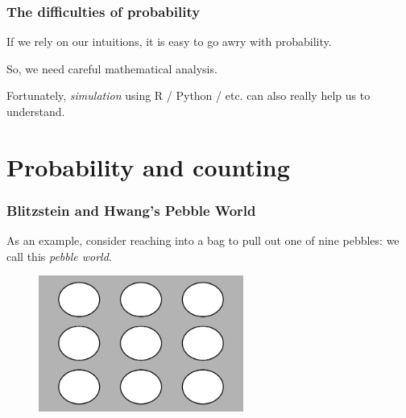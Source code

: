 \documentclass{beamer}
\begin{document}
	\begin{frame}
		\frametitle{The difficulties of probability}
		
		If we rely on our intuitions, it is easy to go awry with probability.
		
		\vspace{0.5cm}
		
		 So, we need careful mathematical analysis.
		 
		 \vspace{0.5cm}
		
		Fortunately, \textit{simulation} using R / Python / etc. can also really help us to understand.
		
	\end{frame}

	\section{Probability and counting}
	\frame{\tableofcontents[currentsection]}
	
	\begin{frame}
		\frametitle{Blitzstein and Hwang's Pebble World}
		
		As an example, consider reaching into a bag to pull out one of nine pebbles: we call this \textit{pebble world}.
		
		\begin{figure}[ht]
			\centerline{\includegraphics[width=0.6\textwidth]{./figures/pebble_world_base.png}}
		\end{figure}
		
	\end{frame}
\end{document}
